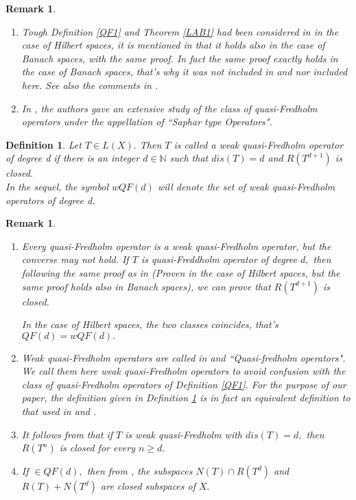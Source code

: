 \documentclass[10pt]{article}
\newcommand{\bdf}{\begin{definition}}
\newcommand{\edf}{\end{definition}}
\newcommand{\bremark}{\begin{remark}\rm}
\newcommand{\eremark}{\end{remark}}
\newtheorem{definition}[theorem]{Definition}
\newtheorem{remark}[theorem]{Remark}
\numberwithin{equation}{section}
\begin{document}
\bremark 

\begin{enumerate}
\item Tough Definition \ref{QF1} and Theorem \ref{LAB1} had been considered in \cite{LAB} in the case of Hilbert spaces, it is mentioned in \cite[Remarque, page 206]{LAB}
that it holds also in the case of Banach spaces, with the same proof. In fact the same proof exactly  holds in the case of Banach spaces, that's why  it was not included in \cite[Theorem 2.7]{P7} and nor included  here. See also the comments in \cite [C.22.5]{MU}.

\item In \cite{ZD}, the authors gave an extensive study of the class of quasi-Fredholm operators under the appellation of ``Saphar type Operators".

\end{enumerate}

\eremark


\bdf \cite{MU} \label{QF2} Let  $ T \in L(X). $   Then  $T$  is called a weak quasi-Fredholm
 operator of degree d  if  there is an integer   $d\in \mathbb{N}$ such that $dis(T)=d $  and  $R(T^{d+1})$   is closed.\\

In the sequel, the symbol  $ wQF(d) $ will denote the set of weak quasi-Fredholm operators  of degree d.
\edf


\bremark \label{wQF(d)}

\begin{enumerate}

\item Every quasi-Fredholm operator is a weak quasi-Fredholm operator, but the converse may not hold. If $T$ is quasi-Freddholm operator of degree $d,$ then following the same proof as in \cite[Proposition 3.3.2]{LAB} (Proven in the case of Hilbert spaces, but the same proof holds also in Banach spaces), we can prove that  $ R(T^{d+1})$ is closed.
    
     In the case of Hilbert spaces, the two classes coincides, that's  $ QF(d)= wQF(d).$

\item Weak quasi-Fredholm operators  are called in \cite{MU} and \cite{KMMP}  ``Quasi-fredholm operators".  We  call them here weak quasi-Fredholm operators  to avoid confusion with the class of quasi-Fredholm operators of Definition \ref{QF1}. For the purpose of our paper, the definition given in  Definition \ref{QF2} is in fact an equivalent definition to that  used in \cite{MU} and \cite{KMMP}.
\item It follows from \cite[Lemma 17]{MU} that if $T$ is weak quasi-Fredholm with $dis(T)= d,$ then $R(T^n)$ is closed for every $ n\geq d.$

\item If $\in QF(d),$ then  from \cite[Lemma 17]{MU}, the subspaces  $N(T)\cap R(T^d)$   and  $R(T)+N(T^d)$ are closed subspaces of  $X.$\\
  

\end{enumerate}
\eremark
\end{document}
